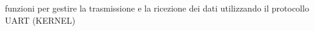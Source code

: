 funzioni per gestire la trasmissione e la ricezione dei dati utilizzando il protocollo U\+A\+RT (K\+E\+R\+N\+EL) 